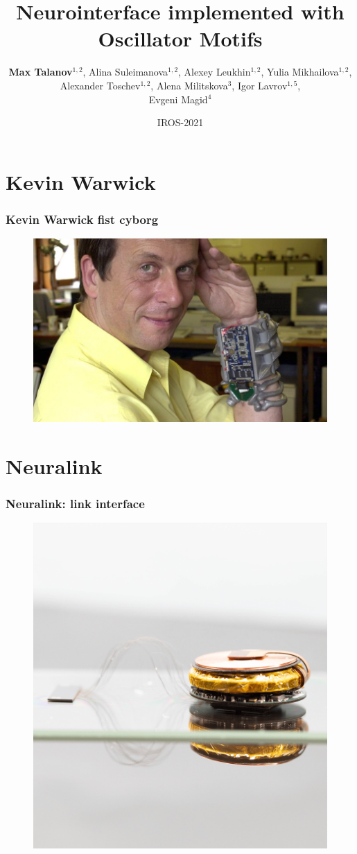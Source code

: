 \documentclass[12pt, aspectratio=169]{beamer}
\title[Neurointerface implemented with Oscillator Motifs]{Neurointerface implemented with Oscillator Motifs} %
\author[Max Talanov]{
  \textbf{Max Talanov}$^{1,2}$, Alina Suleimanova$^{1,2}$, Alexey Leukhin$^{1,2}$,
  Yulia Mikhailova$^{1,2}$, Alexander Toschev$^{1,2}$,
  Alena Militskova$^{3}$, Igor Lavrov$^{1,5}$, \\ Evgeni Magid$^{4}$
}
\institute[B-Rain Labs LLC, NcN laboratory, ITIS, KFU]%
{
  $^{1}$ B-Rain Labs LLC;
  $^{2}$ Neuromorphic computing and Neurosimulations laboratory, ITIS, KFU;
  $^{3}$ Institute of Fundamental Medicine and Biology, KFU;
  $^{4}$ Intelligent Robotic Systems Laboratory (LIRS), ITIS, KFU;
  $^{5}$ Department of Neurologic Surgery, Department of Physiology and Biomedical Engineering, Department of Neurology at Mayo Clinic.
  
\medskip
\textit{max.talanov@b-rain.org}\\ %

}
\date{IROS-2021} %
\begin{document}
\begin{frame}
\titlepage %
\end{frame}



\section{Kevin Warwick}
\begin{frame}
  \frametitle{Kevin Warwick fist cyborg}
  \begin{figure}
    \includegraphics[width=0.7\linewidth]{Kevin-Warwick_2936650k}
  \end{figure}
\end{frame}


\section{Neuralink}

\begin{frame}
  \frametitle{Neuralink: link interface}
  \begin{figure}
    \includegraphics[width=0.4\linewidth]{approach-link-1}
  \end{figure}
\end{frame}
\end{document}
